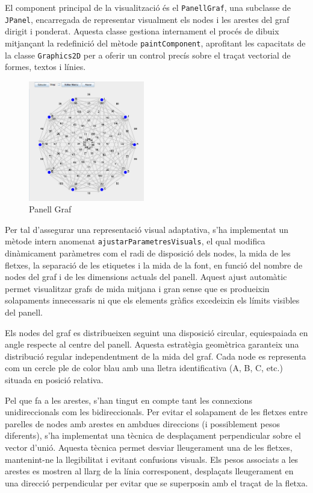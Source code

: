 \documentclass{ieeetj}
\begin{document}
El component principal de la visualització és el \texttt{PanellGraf}, una subclasse de \texttt{JPanel}, encarregada de representar visualment els nodes i les arestes del graf dirigit i ponderat. Aquesta classe gestiona internament el procés de dibuix mitjançant la redefinició del mètode \texttt{paintComponent}, aprofitant les capacitats de la classe \texttt{Graphics2D} per a oferir un control precís sobre el traçat vectorial de formes, textos i línies.\newline

\begin{figure}[H]
    \centering
    \includegraphics[width=0.45\textwidth]{png/graf.png}
    \caption{Panell Graf}
\end{figure}

Per tal d’assegurar una representació visual adaptativa, s’ha implementat un mètode intern anomenat \texttt{ajustarParametresVisuals}, el qual modifica dinàmicament paràmetres com el radi de disposició dels nodes, la mida de les fletxes, la separació de les etiquetes i la mida de la font, en funció del nombre de nodes del graf i de les dimensions actuals del panell. Aquest ajust automàtic permet visualitzar grafs de mida mitjana i gran sense que es produeixin solapaments innecessaris ni que els elements gràfics excedeixin els límits visibles del panell.\newline

Els nodes del graf es distribueixen seguint una disposició circular, equiespaiada en angle respecte al centre del panell. Aquesta estratègia geomètrica garanteix una distribució regular independentment de la mida del graf. Cada node es representa com un cercle ple de color blau amb una lletra identificativa (A, B, C, etc.) situada en posició relativa.\newline

Pel que fa a les arestes, s’han tingut en compte tant les connexions unidireccionals com les bidireccionals. Per evitar el solapament de les fletxes entre parelles de nodes amb arestes en ambdues direccions (i possiblement pesos diferents), s’ha implementat una tècnica de desplaçament perpendicular sobre el vector d’unió. Aquesta tècnica permet desviar lleugerament una de les fletxes, mantenint-ne la llegibilitat i evitant confusions visuals. Els pesos associats a les arestes es mostren al llarg de la línia corresponent, desplaçats lleugerament en una direcció perpendicular per evitar que se superposin amb el traçat de la fletxa.\newline
\end{document}
